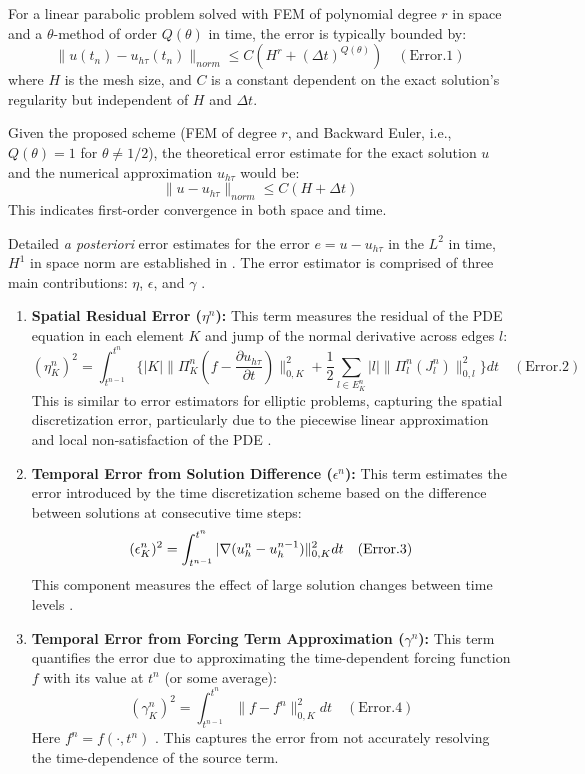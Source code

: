 \documentclass[
  11pt,
]{article}
\begin{document}
For a linear parabolic problem solved with FEM of polynomial degree
$r$ in space and a $\theta$-method of order $Q(\theta)$ in time,
the error is typically bounded by: \[
\|u(t_n) - u_{h\tau}(t_n)\|_{norm} \le C \left( H^r + (\Delta t)^{Q(\theta)} \right) \quad (\text{Error.1})
\] where $H$ is the mesh size, and $C$ is a constant dependent on
the exact solution's regularity but independent of $H$ and
$\Delta t$.

Given the proposed scheme (FEM of degree $r$, and Backward Euler, i.e., $Q(\theta)=1$ for $\theta \neq 1/2$), the
theoretical error estimate for the exact solution $u$ and the
numerical approximation $u_{h\tau}$ would be: \[
\|u - u_{h\tau}\|_{norm} \le C (H + \Delta t)
\] This indicates first-order convergence in both space and time.

Detailed \textit{a posteriori} error estimates for the error $e = u - u_{h\tau}$ in the $L^2$ in time, $H^1$ in space norm are established in \cite{picasso1998}. The error estimator is comprised of three main contributions: $\eta$, $\epsilon$, and $\gamma$ \cite{picasso1998}.

\begin{enumerate}
\def\labelenumi{\arabic{enumi}.}
\item
  \textbf{Spatial Residual Error ($\eta^n$):} This term measures the
  residual of the PDE equation in each element $K$ and jump of the
  normal derivative across edges $l$: \[
  (\eta_{K}^{n})^{2}=\int_{t^{n-1}}^{t^{n}}\{|K|\|\Pi_{K}^{n}(f-\frac{\partial u_{h\tau}}{\partial t})\|_{0,K}^{2}+\frac{1}{2}\sum_{l\in E_{K}^{n}}|l|\|\Pi_{l}^{n}(J_{l}^{n})\|_{0,l}^{2}\}dt \quad (\text{Error.2})
  \] This is similar to error estimators for elliptic problems,
  capturing the spatial discretization error, particularly due to the
  piecewise linear approximation and local non-satisfaction of the PDE
  \cite{picasso1998}.
\item
  \textbf{Temporal Error from Solution Difference ($\epsilon^n$):}
  This term estimates the error introduced by the time discretization
  scheme based on the difference between solutions at consecutive time
  steps: \[
  (\epsilon_{K}^{n})^{2}=\int_{t^{n-1}}^{t^{n}}\\|\nabla(u_{h}^{n}-u_{h}^{n-1})\|_{0,K}^{2}dt \quad (\text{Error.3})
  \] This component measures the effect of large solution changes
  between time levels \cite{picasso1998}.
\item
  \textbf{Temporal Error from Forcing Term Approximation
  ($\gamma^n$):} This term quantifies the error due to approximating
  the time-dependent forcing function $f$ with its value at $t^n$
  (or some average): \[
  (\gamma_{K}^{n})^{2}=\int_{t^{n-1}}^{t^{n}}\|f-f^{n}\|_{0,K}^{2}dt \quad (\text{Error.4})
  \] Here $f^n=f(\cdot,t^n)$ \cite{picasso1998}. This captures the error from
  not accurately resolving the time-dependence of the source term.
\end{enumerate}
\end{document}
